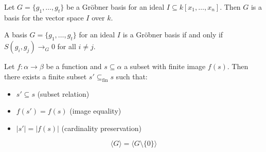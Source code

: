 \begin{lemma}\label{groebner_basis_is_basis}

  Let \( G = \{g_1, \ldots, g_t\} \) be a Gröbner basis for an ideal \( I \subseteq k[x_1, \ldots, x_n] \). Then \( G \) is a basis for the vector space \( I \) over \( k \).
\end{lemma}

\begin{lemma}\label{buchberger_criterion}

  A basis \( G = \{ g_1, \ldots, g_t \} \) for an ideal \( I \) is a Gröbner basis if and only if \( S(g_i, g_j) \to_G 0 \) for all \( i \neq j \).
\end{lemma}

\begin{lemma}\label{finset_subset_preimage_of_finite_image}

  \leanok
  Let $f: \alpha \to \beta$ be a function and $s \subseteq \alpha$ a subset with finite image $f(s)$. Then there exists a finite subset $s' \subseteq_{\text{fin}} s$ such that:
\begin{itemize}
\item $s' \subseteq s$ (subset relation)
\item $f(s') = f(s)$ (image equality)
\item $|s'| = |f(s)|$ (cardinality preservation)
\end{itemize}

\end{lemma}

\begin{lemma}\label{span_sdiff_singleton_zero}

  \leanok
  \[
\langle G \rangle = \langle G \setminus \{0\} \rangle
\]

\end{lemma}